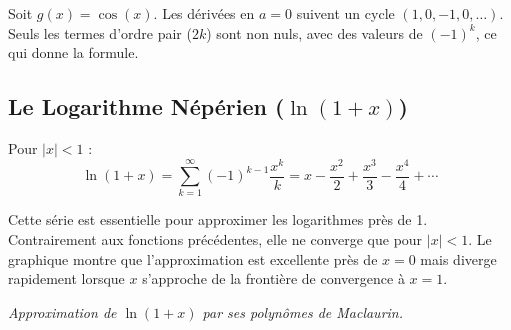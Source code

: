 \begin{proofbox}
Soit $g(x) = \cos(x)$. Les dérivées en $a=0$ suivent un cycle $(1, 0, -1, 0, \dots)$. Seuls les termes d'ordre pair ($2k$) sont non nuls, avec des valeurs de $(-1)^k$, ce qui donne la formule.
\end{proofbox}


\subsection{Le Logarithme Népérien ($\ln(1+x)$)}

\begin{theorembox}
Pour $|x| < 1$ :
$$ \ln(1+x) = \sum_{k=1}^{\infty} (-1)^{k-1} \frac{x^k}{k} = x - \frac{x^2}{2} + \frac{x^3}{3} - \frac{x^4}{4} + \cdots $$
\end{theorembox}

\begin{intuitionbox}
Cette série est essentielle pour approximer les logarithmes près de 1. Contrairement aux fonctions précédentes, elle ne converge que pour $|x|<1$. Le graphique montre que l'approximation est excellente près de $x=0$ mais diverge rapidement lorsque $x$ s'approche de la frontière de convergence à $x=1$.

\tcblower

\centering
{}
\par\small\textit{Approximation de $\ln(1+x)$ par ses polynômes de Maclaurin.}
\end{intuitionbox}

